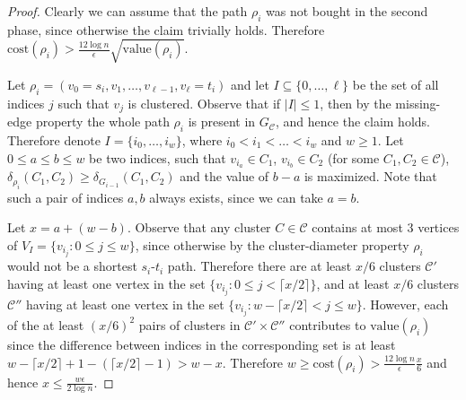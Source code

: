 \documentclass[a4paper,11pt]{article}
\theoremstyle{definition}
\newcommand{\dist}{\delta}
\newcommand{\cost}{\mathrm{cost}}
\newcommand{\val}{\mathrm{value}}
\newcommand{\cC}{\mathcal{C}}
\begin{document}
\begin{proof}
Clearly we can assume that the path $\rho_i$ was not bought in the second phase,
since otherwise the claim trivially holds.
Therefore 
$\cost(\rho_i) > \frac{12\log n}{\epsilon} \sqrt{\val(\rho_i)}.$

Let $\rho_i=(v_0=s_i,v_1,\ldots,v_{\ell-1},v_{\ell}=t_i)$
and let $I \subseteq \{0,\ldots, \ell\}$ be the set of all indices
$j$ such that $v_j$ is clustered.
Observe that if $|I| \le 1$, then by the missing-edge property
the whole path $\rho_i$ is present in $G_\cC$, and hence the claim holds.
Therefore denote $I = \{i_0,\ldots,i_w\}$, where $i_0 < i_1 < \ldots < i_w$ and $w \ge 1$.
Let $0 \le a \le b \le w$ be two indices, such that $v_{i_a} \in C_1$, $v_{i_b} \in C_2$ (for some $C_1, C_2 \in \cC$),
$\dist_{\rho_i}(C_1, C_2) \ge \dist_{G_{i-1}}(C_1,C_2)$ and the value of $b-a$ is maximized.
Note that such a pair of indices $a,b$ always exists, since we can take $a=b$.

Let $x=a+(w-b)$. Observe that any cluster $C \in \cC$ contains at most $3$ vertices of $V_I=\{v_{i_j} : 0 \le j \le w\}$,
since otherwise by the cluster-diameter property $\rho_i$ 
would not be a shortest $s_i$-$t_i$ path.
Therefore there are at least $x/6$ clusters $\cC'$ having at least one vertex in the set $\{v_{i_j} : 0 \le j < \lceil x/2 \rceil\}$,
and at least $x/6$ clusters $\cC''$ having at least one vertex in the set $\{v_{i_j} : w-\lceil x/2 \rceil < j \le w\}$.
However, each of the at least $(x/6)^2$ pairs of clusters in $\cC'\times \cC''$ contributes to $\val(\rho_i)$ 
since the difference between indices in the corresponding set is at least 
$w-\lceil x/2 \rceil + 1 - (\lceil x/2 \rceil - 1) > w-x$.
Therefore $w \ge \cost(\rho_i) > \frac{12 \log n}{\epsilon} \frac{x}{6}$ and hence
$x \le \frac{w\epsilon}{2\log n}$.


\end{proof}
\end{document}
